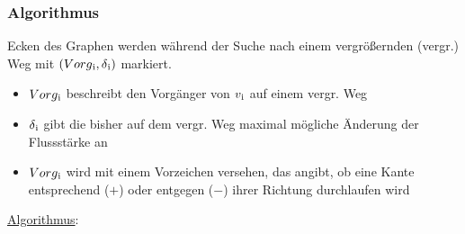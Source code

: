 \documentclass[11pt]{article}
\begin{document}
\subsubsection{Algorithmus}
Ecken des Graphen werden w\"ahrend der Suche nach einem vergr\"o\ss{}ernden (vergr.) Weg mit $(Vorg\textsubscript{i},\delta\textsubscript{i})$ markiert.
\begin{itemize}
\item $Vorg\textsubscript{i}$ beschreibt den Vorg\"anger von $v\textsubscript{i}$ auf einem vergr. Weg
\item $\delta\textsubscript{i}$ gibt die bisher auf dem vergr. Weg maximal m\"ogliche \"Anderung der Flussst\"arke an
\item $Vorg\textsubscript{i}$ wird mit einem Vorzeichen versehen, das angibt, ob eine Kante entsprechend ($+$) oder entgegen ($-$) ihrer Richtung durchlaufen wird
\end{itemize}
\newpage
\underline{Algorithmus}:
\end{document}
